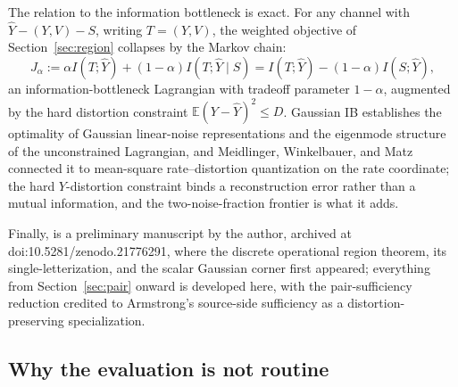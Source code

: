 \documentclass[11pt,onecolumn]{IEEEtran}
\newcommand{\E}{\mathbb{E}}
\newcommand{\hY}{\widehat{Y}}
\begin{document}
The relation to the information bottleneck \cite{tishby1999} is exact.
For any channel with $\hY-(Y,V)-S$, writing $T=(Y,V)$, the weighted
objective of Section~\ref{sec:region} collapses by the Markov chain:
\begin{equation}
J_\alpha:=\alpha I(T;\hY)+(1-\alpha)I(T;\hY\mid S)
=I(T;\hY)-(1-\alpha)I(S;\hY),
\label{eq:ib-identity}
\end{equation}
an information-bottleneck Lagrangian with tradeoff parameter
$1-\alpha$, augmented by the hard distortion constraint
$\E(Y-\hY)^2\le D$. Gaussian IB \cite{chechik2005} establishes the
optimality of Gaussian linear-noise representations and the eigenmode
structure of the unconstrained Lagrangian, and Meidlinger, Winkelbauer,
and Matz \cite{meidlinger2014} connected it to mean-square
rate--distortion quantization on the rate coordinate; the hard
$Y$-distortion constraint binds a reconstruction error rather than a
mutual information, and the two-noise-fraction frontier is what it adds.

Finally, \cite{bond2026landauer} is a preliminary manuscript by the
author, archived at doi:10.5281/zenodo.21776291, where the discrete
operational region theorem, its single-letterization, and the scalar
Gaussian corner first appeared; everything from Section~\ref{sec:pair}
onward is developed here, with the pair-sufficiency reduction credited
to Armstrong's source-side sufficiency \cite{armstrong2026} as a
distortion-preserving specialization.

\subsection*{Why the evaluation is not routine}
\end{document}
